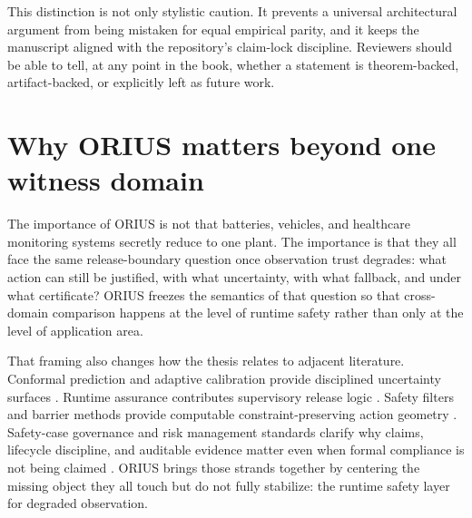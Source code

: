 This distinction is not only stylistic caution. It prevents a universal architectural argument
from being mistaken for equal empirical parity, and it keeps the manuscript aligned with the
repository's claim-lock discipline. Reviewers should be able to tell, at any point in the book,
whether a statement is theorem-backed, artifact-backed, or explicitly left as future work.

\section{Why ORIUS matters beyond one witness domain}
The importance of ORIUS is not that batteries, vehicles, and healthcare monitoring systems
secretly reduce to one plant. The importance is
that they all face the same release-boundary question once observation trust degrades: what
action can still be justified, with what uncertainty, with what fallback, and under what
certificate? ORIUS freezes the semantics of that question so that cross-domain comparison
happens at the level of runtime safety rather than only at the level of application area.

That framing also changes how the thesis relates to adjacent literature. Conformal prediction and
adaptive calibration provide disciplined uncertainty surfaces \cite{vovk2005algorithmic,romano2019conformalized,gibbs2021adaptive}.
Runtime assurance contributes supervisory release logic \cite{sha1998simplex,sha2001using}.
Safety filters and barrier methods provide computable constraint-preserving action geometry
\cite{ames2019control,ames2014cbf,wabersich2021predictive}. Safety-case governance and risk
management standards clarify why claims, lifecycle discipline, and auditable evidence matter even
when formal compliance is not being claimed \cite{ul4600_2023,nist2023ai_rmf,iso26262_2018,iec61508_2010}.
ORIUS brings those strands together by centering the missing object they all touch but do not
fully stabilize: the runtime safety layer for degraded observation.

